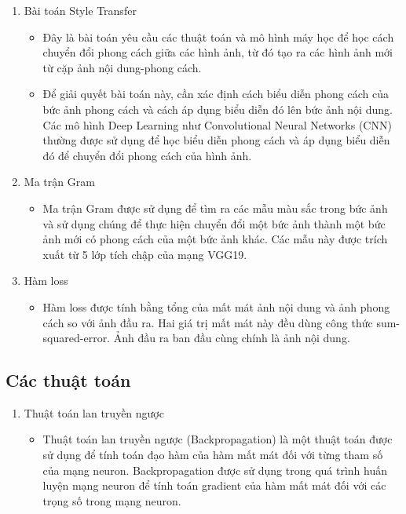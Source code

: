\documentclass{article}
\begin{document}
\begin{enumerate}
\item Bài toán Style Transfer
\begin{itemize}
\item Đây là bài toán yêu cầu các thuật toán và mô hình máy học để học cách chuyển đổi phong cách giữa các hình ảnh, từ đó tạo ra các hình ảnh mới từ cặp ảnh nội dung-phong cách.
\item Để giải quyết bài toán này, cần xác định cách biểu diễn phong cách của bức ảnh phong cách và cách áp dụng biểu diễn đó lên bức ảnh nội dung. Các mô hình Deep Learning như Convolutional Neural Networks (CNN) thường được sử dụng để học biểu diễn phong cách và áp dụng biểu diễn đó để chuyển đổi phong cách của hình ảnh.
\end{itemize}

\item Ma trận Gram
\begin{itemize}
\item Ma trận Gram được sử dụng để tìm ra các mẫu màu sắc trong bức ảnh và sử dụng chúng để thực hiện chuyển đổi một bức ảnh thành một bức ảnh mới có phong cách của một bức ảnh khác. Các mẫu này được trích xuất từ 5 lớp tích chập của mạng VGG19.
\end{itemize}

\item Hàm loss
\begin{itemize}
\item Hàm loss được tính bằng tổng của mất mát ảnh nội dung và ảnh phong cách so với ảnh đầu ra. Hai giá trị mất mát này đều dùng công thức sum-squared-error. Ảnh đầu ra ban đầu cùng chính là ảnh nội dung.
\end{itemize}
\end{enumerate}

\subsection{Các thuật toán}
\vspace{1cm}
\begin{enumerate}
\item Thuật toán lan truyền ngược
\begin{itemize}
\item Thuật toán lan truyền ngược (Backpropagation) là một thuật toán được sử dụng để tính toán đạo hàm của hàm mất mát đối với từng tham số của mạng neuron. Backpropagation được sử dụng trong quá trình huấn luyện mạng neuron để tính toán gradient của hàm mất mát đối với các trọng số trong mạng neuron.
\end{itemize}
\end{enumerate}
\end{document}
